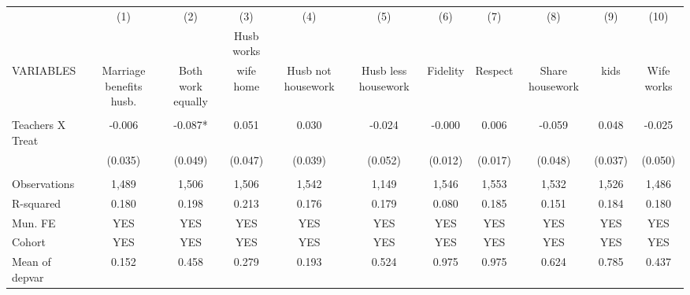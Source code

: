 \begin{tabular}{lcccccccccc} \hline
 & (1) & (2) & (3) & (4) & (5) & (6) & (7) & (8) & (9) & (10) \\
 &  &  & Husb works &  &  &  &  &  &  &  \\
VARIABLES & Marriage benefits husb. & Both work equally & wife home & Husb not housework & Husb less housework & Fidelity & Respect & Share housework & kids & Wife works \\ \hline
 &  &  &  &  &  &  &  &  &  &  \\
Teachers X Treat & -0.006 & -0.087* & 0.051 & 0.030 & -0.024 & -0.000 & 0.006 & -0.059 & 0.048 & -0.025 \\
 & (0.035) & (0.049) & (0.047) & (0.039) & (0.052) & (0.012) & (0.017) & (0.048) & (0.037) & (0.050) \\
 &  &  &  &  &  &  &  &  &  &  \\
Observations & 1,489 & 1,506 & 1,506 & 1,542 & 1,149 & 1,546 & 1,553 & 1,532 & 1,526 & 1,486 \\
R-squared & 0.180 & 0.198 & 0.213 & 0.176 & 0.179 & 0.080 & 0.185 & 0.151 & 0.184 & 0.180 \\
Mun. FE & YES & YES & YES & YES & YES & YES & YES & YES & YES & YES \\
Cohort & YES & YES & YES & YES & YES & YES & YES & YES & YES & YES \\
 Mean of depvar & 0.152 & 0.458 & 0.279 & 0.193 & 0.524 & 0.975 & 0.975 & 0.624 & 0.785 & 0.437 \\ \hline
\end{tabular}
